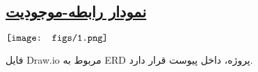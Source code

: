 \subsection*{\underline{نمودار رابطه-موجودیت}}

$\\ \texttt{[image: figs/1.png]}$

فایل Draw.io مربوط به ERD پروژه، داخل پیوست قرار دارد. 